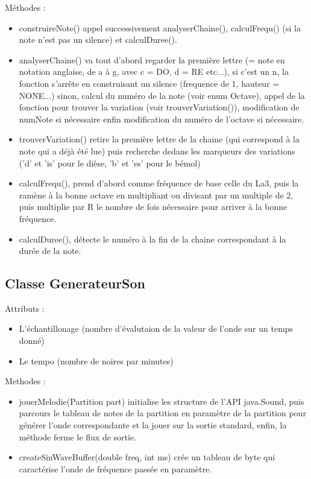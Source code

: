 \documentclass{EPUProjetPeiP}
\begin{document}
Méthodes :
\begin{itemize}
\item construireNote() appel successivement analyserChaine(), calculFrequ() (si la note n'est pas un silence) et calculDuree().
\item analyserChaine() va tout d'abord regarder la première lettre (= note en notation anglaise, de a à g, avec c = DO, d = RE etc...), si c'est un n, la fonction s'arrête en construisant un silence (frequence de 1, hauteur = NONE...) sinon, calcul du numéro de la note (voir enum Octave), appel de la fonction pour trouver la variation (voir trouverVariation()), modification de numNote si nécessaire enfin modification du numéro de l'octave si nécessaire.
\item trouverVariation() retire la première lettre de la chaine (qui correspond à la note qui a déjà été lue) puis recherche dedans les marqueurs des variations ('d' et 'is' pour le dièse, 'b' et 'es' pour le bémol)
\item calculFrequ(), prend d'abord comme fréquence de base celle du La3, puis la ramène à la bonne octave en multipliant ou divisant par un multiple de 2, puis multiplie par R le nombre de fois nécessaire pour arriver à la bonne fréquence.
\item calculDuree(), détecte le numéro à la fin de la chaine correspondant à la durée de la note.
\end{itemize}

\subsection{Classe GenerateurSon}

Attributs :
\begin{itemize}
\item L'échantillonage (nombre d'évalutaion de la valeur de l'onde sur un temps donné)
\item Le tempo (nombre de noires par minutes)
\end{itemize}

Methodes :
\begin{itemize}
\item jouerMelodie(Partition part) initialise les structure de l'API java.Sound, puis parcours le tableau de notes de la partition en paramètre de la partition pour générer l'onde correspondante et la jouer sur la sortie standard, enfin, la méthode ferme le flux de sortie.
\item createSinWaveBuffer(double freq, int ms) crée un tableau de byte qui caractérise l'onde de fréquence passée en paramètre.
\end{itemize}
\end{document}
